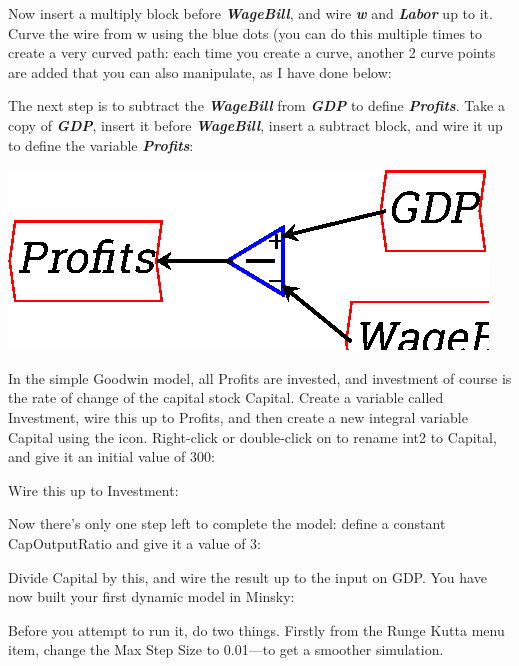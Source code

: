 Now insert a multiply block before {\bf\em WageBill}, and wire {\bf\em
w} and {\bf\em Labor} up to it. Curve the wire from w using the blue
dots (you can do this multiple times to create a very curved path:
each time you create a curve, another 2 curve points are added that
you can also manipulate, as I have done below: 



The next step is to subtract the {\bf\em WageBill} from {\bf\em GDP}
to define {\bf\em Profits}. Take a copy of {\bf\em GDP}, insert it
before {\bf\em WageBill}, insert a subtract block, and wire it up to
define the variable {\bf\em Profits}:

\begin{center}
\includegraphics{images/NewItem100.eps}
\end{center}


In the simple Goodwin model, all Profits are invested, and investment
of course is the rate of change of the capital stock Capital. Create a
variable called Investment, wire this up to Profits, and then create a
new integral variable Capital using the 
icon. Right-click or double-click on to rename int2 to Capital, and
give it an initial value of 300: 


Wire this up to Investment:


Now there's only one step left to complete the model: define a
constant CapOutputRatio and give it a value of 3:



Divide Capital by this, and wire the result up to the input on
GDP. You have now built your first dynamic model in Minsky: 


Before you attempt to run it, do two things. Firstly from the Runge
Kutta menu item, change the Max Step Size to 0.01---to get a smoother
simulation. 

